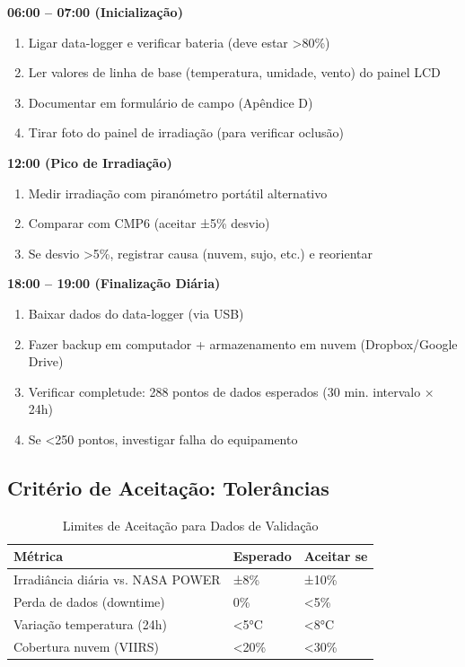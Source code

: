 \documentclass[12pt, a4paper]{article}
\begin{document}
{{{{{{{{{{{{\textbf{06:00 – 07:00 (Inicialização)}
\begin{enumerate}
\item Ligar data-logger e verificar bateria (deve estar >80\%)
\item Ler valores de linha de base (temperatura, umidade, vento) do painel LCD
\item Documentar em formulário de campo (Apêndice D)
\item Tirar foto do painel de irradiação (para verificar oclusão)
\end{enumerate}

\textbf{12:00 (Pico de Irradiação)}
\begin{enumerate}
\item Medir irradiação com piranómetro portátil alternativo
\item Comparar com CMP6 (aceitar ±5\% desvio)
\item Se desvio >5\%, registrar causa (nuvem, sujo, etc.) e reorientar
\end{enumerate}

\textbf{18:00 – 19:00 (Finalização Diária)}
\begin{enumerate}
\item Baixar dados do data-logger (via USB)
\item Fazer backup em computador + armazenamento em nuvem (Dropbox/Google Drive)
\item Verificar completude: 288 pontos de dados esperados (30 min. intervalo × 24h)
\item Se <250 pontos, investigar falha do equipamento
\end{enumerate}

\subsection{Critério de Aceitação: Tolerâncias}

\begin{table}[H]
\centering
\caption{Limites de Aceitação para Dados de Validação}
\label{tab:acceptance_criteria}
\small
\begin{tabular}{|l|l|l|}
\hline
\textbf{Métrica} & \textbf{Esperado} & \textbf{Aceitar se} \\
\hline
Irradiância diária vs. NASA POWER & ±8\% & ±10\% \\
Perda de dados (downtime) & 0\% & <5\% \\
Variação temperatura (24h) & <5°C & <8°C \\
Cobertura nuvem (VIIRS) & <20\% & <30\% \\
\hline
\end{tabular}
\end{table}

}}}}}}}}}}}}
\end{document}
